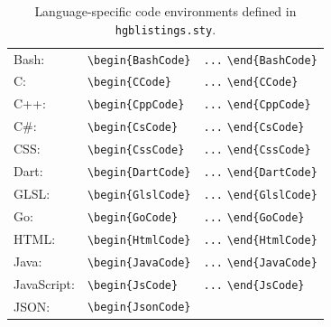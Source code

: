 \begin{table}
    \caption{Language-specific code environments defined in
    \nolinkurl{hgblistings.sty}.}
    \label{tab:CodeEnvironments}
    \centering
    \begin{tabular}{@{}lll@{}}
        \toprule
        Bash: & \verb!\begin{BashCode}!
        & \verb!...! \verb!\end{BashCode}! \\
        C: & \verb!\begin{CCode}!
        & \verb!...! \verb!\end{CCode}! \\
        C++: & \verb!\begin{CppCode}!
        & \verb!...! \verb!\end{CppCode}! \\
        C\#: & \verb!\begin{CsCode}!
        & \verb!...! \verb!\end{CsCode}! \\
        CSS: & \verb!\begin{CssCode}!
        & \verb!...! \verb!\end{CssCode}! \\
        Dart: & \verb!\begin{DartCode}!
        & \verb!...! \verb!\end{DartCode}! \\
        GLSL: & \verb!\begin{GlslCode}!
        & \verb!...! \verb!\end{GlslCode}! \\
        Go: & \verb!\begin{GoCode}!
        & \verb!...! \verb!\end{GoCode}! \\
        HTML: & \verb!\begin{HtmlCode}!
        & \verb!...! \verb!\end{HtmlCode}! \\
        Java: & \verb!\begin{JavaCode}!
        & \verb!...! \verb!\end{JavaCode}! \\
        JavaScript: & \verb!\begin{JsCode}!
        & \verb!...! \verb!\end{JsCode}! \\
        JSON: & \verb!\begin{JsonCode}!

\end{tabular}
\end{table}
